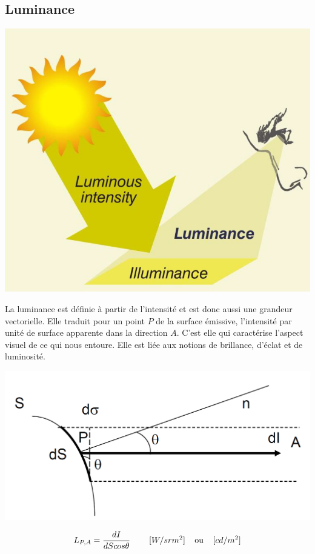 \documentclass[11pt]{report}
\begin{document}
\subsection{Luminance}
\begin{minipage}{0.2\linewidth}
\centering
\includegraphics[scale=0.18]{lumi}
\end{minipage}
\begin{minipage}{0.75\linewidth}
La luminance est définie à partir de l'intensité et est donc aussi une grandeur vectorielle. Elle traduit pour un point $P$ de la surface émissive, l'intensité par unité de surface apparente dans la direction $A$.
C'est elle qui caractérise l'aspect visuel de ce qui nous entoure. Elle est liée aux notions de brillance, d'éclat et de luminosité.
\end{minipage}


\begin{minipage}{0.3\linewidth}
\centering
\includegraphics[scale=0.22]{lumi_dia}
\end{minipage}
\begin{minipage}{0.65\linewidth}
$$L_{P,A} = \frac{dI}{dS cos \theta}\;\;\;\;\;\;\;\; [W/sr m^2]\;\;\;\;\textup{ou} \;\;\;\; [cd/m^2]$$

\end{minipage}
\end{document}
